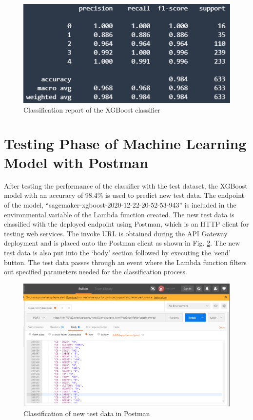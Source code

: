 \begin{figure} [ht]
    \centering
    \includegraphics[scale=1.3]{pages/Chapter5/Chapter 5 images/C_report_xgb6k.PNG}
    \caption{Classification report of the XGBoost classifier}
    \label{fig_crxgb}
\end{figure}
\section{Testing Phase of Machine Learning Model with Postman}
\label{post_man_testing}
After testing the performance of the classifier with the test dataset, the XGBoost model with an accuracy of 98.4\% is used to predict new test data. The endpoint of the model, ``sagemaker-xgboost-2020-12-22-20-52-53-943'' is included in the environmental variable of the Lambda function created. The new test data is classified with the deployed endpoint using Postman, which is an HTTP client for testing web services. The invoke URL is obtained during the API Gateway deployment and is placed onto the Postman client as shown in Fig. \ref{fig_post}. The new test data is also put into the `body' section followed by executing the `send' button. The test data passes through an event where the Lambda function filters out specified parameters needed for the classification process.
\begin{figure} [ht]
    \centering
    \includegraphics[scale=0.55]{pages/Chapter5/Chapter 5 images/POSTMAN1.PNG}
    \caption{Classification of new test data in Postman}
    \label{fig_post}
\end{figure}

